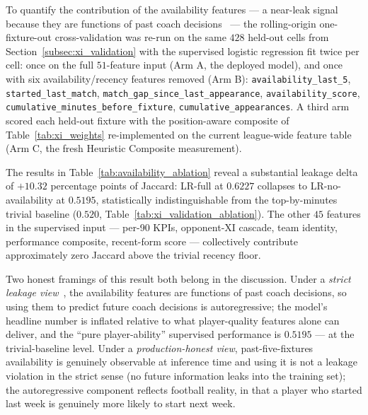 To quantify the contribution of the availability features --- a near-leak signal because they are functions of past coach decisions~\cite{kaufman2012leakage} --- the rolling-origin one-fixture-out cross-validation was re-run on the same $428$ held-out cells from Section~\ref{subsec:xi_validation} with the supervised logistic regression fit twice per cell: once on the full $51$-feature input (Arm A, the deployed model), and once with six availability/recency features removed (Arm B): \texttt{availability\_last\_5}, \texttt{started\_last\_match}, \texttt{match\_gap\_\allowbreak since\_\allowbreak last\_\allowbreak appearance}, \texttt{availability\_score}, \texttt{cumulative\_minutes\_\allowbreak before\_\allowbreak fixture}, \texttt{cumulative\_\allowbreak appearances}. A third arm scored each held-out fixture with the position-aware composite of Table~\ref{tab:xi_weights} re-implemented on the current league-wide feature table (Arm C, the fresh Heuristic Composite measurement).

The results in Table~\ref{tab:availability_ablation} reveal a substantial leakage delta of $+10.32$ percentage points of Jaccard: LR-full at $0.6227$ collapses to LR-no-availability at $0.5195$, statistically indistinguishable from the top-by-minutes trivial baseline ($0.520$, Table~\ref{tab:xi_validation_ablation}). The other $45$ features in the supervised input --- per-90 KPIs, opponent-XI cascade, team identity, performance composite, recent-form score --- collectively contribute approximately zero Jaccard above the trivial recency floor.

Two honest framings of this result both belong in the discussion. Under a \emph{strict leakage view}~\cite{kaufman2012leakage}, the availability features are functions of past coach decisions, so using them to predict future coach decisions is autoregressive; the model's headline number is inflated relative to what player-quality features alone can deliver, and the ``pure player-ability'' supervised performance is $0.5195$ --- at the trivial-baseline level. Under a \emph{production-honest view}, past-five-fixtures availability is genuinely observable at inference time and using it is not a leakage violation in the strict sense (no future information leaks into the training set); the autoregressive component reflects football reality, in that a player who started last week is genuinely more likely to start next week.

